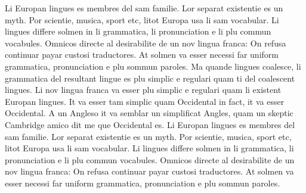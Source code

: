 Li Europan lingues es membres del sam familie. Lor separat existentie es un 
myth. Por scientie, musica, sport etc, litot Europa usa li sam vocabular. Li 
lingues differe solmen in li grammatica, li pronunciation e li plu commun 
vocabules. Omnicos directe al desirabilite de un nov lingua franca: On refusa 
continuar payar custosi traductores. At solmen va esser necessi far uniform 
grammatica, pronunciation e plu sommun paroles. Ma quande lingues coalesce, li 
grammatica del resultant lingue es plu simplic e regulari quam ti del coalescent 
lingues. Li nov lingua franca va esser plu simplic e regulari quam li existent 
Europan lingues. It va esser tam simplic quam Occidental in fact, it va esser 
Occidental. A un Angleso it va semblar un simplificat Angles, quam un skeptic 
Cambridge amico dit me que Occidental es. Li Europan lingues es membres del sam 
familie. Lor separat existentie es un myth. Por scientie, musica, sport etc, 
litot Europa usa li sam vocabular. Li lingues differe solmen in li grammatica, 
li pronunciation e li plu commun vocabules. Omnicos directe al desirabilite de 
un nov lingua franca: On refusa continuar payar custosi traductores. At solmen 
va esser necessi far uniform grammatica, pronunciation e plu sommun paroles. 

 